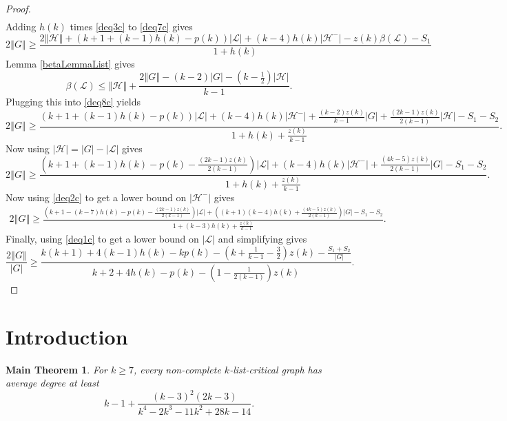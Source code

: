 \documentclass[10pt]{article}
\theoremstyle{plain}
\newtheorem*{MainTheorem}{Main Theorem}
\theoremstyle{definition}
\theoremstyle{remark}
\newcommand{\fancy}[1]{\mathcal{#1}}
\renewcommand{\L}{\fancy{L}}
\newcommand{\HH}{\fancy{H}}
\newcommand{\card}[1]{\left|#1\right|}
\newcommand{\size}[1]{\left\Vert#1\right\Vert}
\newcommand{\parens}[1]{\left( #1 \right)}
\begin{document}
\begin{proof}
\begin{align*}
\end{align*}
Adding $h(k)$ times \eqref{deq3c} to \eqref{deq7c} gives
\begin{equation}\label{deq8c}
2\size{G} \ge \frac{2\size{\HH} + \parens{k+1 +(k-1)h(k)- p(k)}\card{\L} + (k- 4)h(k)\card{\HH^-}  - z(k)\beta(\L) - S_1}{1 + h(k)}
\end{equation}
Lemma \ref{betaLemmaList} gives
\[\beta(\L) \le \size{\HH} + \frac{2\size{G} - (k-2)\card{G} - \parens{k - \frac12}\card{\HH}}{k-1}.\]
Plugging this into \eqref{deq8c} yields
\begin{equation}\label{deq9c}
2\size{G} \ge \frac{\parens{k+1 +(k-1)h(k)- p(k)}\card{\L} + (k- 4)h(k)\card{\HH^-} +\frac{(k-2)z(k)}{k-1}\card{G} + \frac{(2k-1)z(k)}{2(k-1)}\card{\HH} - S_1 - S_2}{1 + h(k) + \frac{z(k)}{k-1}}.
\end{equation}
Now using $\card{\HH} = \card{G} - \card{\L}$ gives
\begin{equation}\label{deq10c}
2\size{G} \ge \frac{\parens{k+1 +(k-1)h(k)- p(k) - \frac{(2k-1)z(k)}{2(k-1)}}\card{\L} + (k- 4)h(k)\card{\HH^-} +\frac{(4k-5)z(k)}{2(k-1)}\card{G} - S_1- S_2}{1 + h(k) + \frac{z(k)}{k-1}}.
\end{equation}
Now using \eqref{deq2c} to get a lower bound on $\card{\HH^-}$ gives
\begin{equation}\label{deq11c}
\begin{align*}
2\size{G} \ge \frac{\parens{k+1 - (k-7)h(k)- p(k) - \frac{(2k-1)z(k)}{2(k-1)}}\card{\L}+\parens{(k+1)(k-4)h(k) + \frac{(4k-5)z(k)}{2(k-1)}}\card{G} - S_1- S_2}{1 + (k-3)h(k) + \frac{z(k)}{k-1}}.
\end{align*}
\end{equation}
Finally, using \eqref{deq1c} to get a lower bound on $\card{\L}$ and simplifying gives
\begin{equation}\label{deq12c}
\frac{2\size{G}}{\card{G}} \ge \frac{k(k+1) + 4(k-1)h(k) - kp(k) - \parens{k + \frac{1}{k-1} - \frac32}z(k) - \frac{S_1 + S_2}{\card{G}}}{k+2 + 4h(k) - p(k) - \parens{1 - \frac{1}{2(k-1)}}z(k)}.
\end{equation}
\end{proof}

\section{Introduction}

\begin{MainTheorem}
For $k \ge 7$, every non-complete $k$-list-critical graph has average degree at least \[k-1 + \frac{(k-3)^2 (2 k-3)}{k^4-2 k^3-11 k^2+28 k-14}.\]
\end{MainTheorem}
\end{document}
